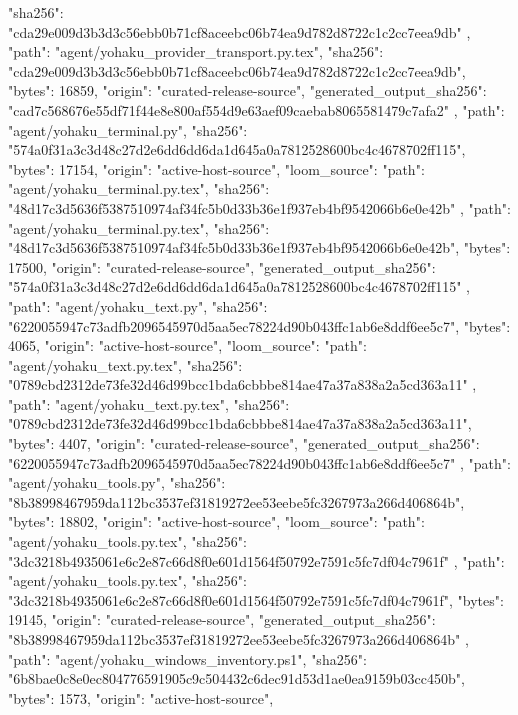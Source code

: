 {{{        "sha256": "cda29e009d3b3d3c56ebb0b71cf8aceebc06b74ea9d782d8722c1c2cc7eea9db"
      }
    },
    {
      "path": "agent/yohaku_provider_transport.py.tex",
      "sha256": "cda29e009d3b3d3c56ebb0b71cf8aceebc06b74ea9d782d8722c1c2cc7eea9db",
      "bytes": 16859,
      "origin": "curated-release-source",
      "generated_output_sha256": "cad7c568676e55df71f44e8e800af554d9e63aef09caebab8065581479c7afa2"
    },
    {
      "path": "agent/yohaku_terminal.py",
      "sha256": "574a0f31a3c3d48c27d2e6dd6dd6da1d645a0a7812528600bc4c4678702ff115",
      "bytes": 17154,
      "origin": "active-host-source",
      "loom_source": {
        "path": "agent/yohaku_terminal.py.tex",
        "sha256": "48d17c3d5636f5387510974af34fc5b0d33b36e1f937eb4bf9542066b6e0e42b"
      }
    },
    {
      "path": "agent/yohaku_terminal.py.tex",
      "sha256": "48d17c3d5636f5387510974af34fc5b0d33b36e1f937eb4bf9542066b6e0e42b",
      "bytes": 17500,
      "origin": "curated-release-source",
      "generated_output_sha256": "574a0f31a3c3d48c27d2e6dd6dd6da1d645a0a7812528600bc4c4678702ff115"
    },
    {
      "path": "agent/yohaku_text.py",
      "sha256": "6220055947c73adfb2096545970d5aa5ec78224d90b043ffc1ab6e8ddf6ee5c7",
      "bytes": 4065,
      "origin": "active-host-source",
      "loom_source": {
        "path": "agent/yohaku_text.py.tex",
        "sha256": "0789cbd2312de73fe32d46d99bcc1bda6cbbbe814ae47a37a838a2a5cd363a11"
      }
    },
    {
      "path": "agent/yohaku_text.py.tex",
      "sha256": "0789cbd2312de73fe32d46d99bcc1bda6cbbbe814ae47a37a838a2a5cd363a11",
      "bytes": 4407,
      "origin": "curated-release-source",
      "generated_output_sha256": "6220055947c73adfb2096545970d5aa5ec78224d90b043ffc1ab6e8ddf6ee5c7"
    },
    {
      "path": "agent/yohaku_tools.py",
      "sha256": "8b38998467959da112bc3537ef31819272ee53eebe5fc3267973a266d406864b",
      "bytes": 18802,
      "origin": "active-host-source",
      "loom_source": {
        "path": "agent/yohaku_tools.py.tex",
        "sha256": "3dc3218b4935061e6c2e87c66d8f0e601d1564f50792e7591c5fc7df04c7961f"
      }
    },
    {
      "path": "agent/yohaku_tools.py.tex",
      "sha256": "3dc3218b4935061e6c2e87c66d8f0e601d1564f50792e7591c5fc7df04c7961f",
      "bytes": 19145,
      "origin": "curated-release-source",
      "generated_output_sha256": "8b38998467959da112bc3537ef31819272ee53eebe5fc3267973a266d406864b"
    },
    {
      "path": "agent/yohaku_windows_inventory.ps1",
      "sha256": "6b8bae0c8e0ec804776591905c9c504432c6dec91d53d1ae0ea9159b03cc450b",
      "bytes": 1573,
      "origin": "active-host-source",
}}
